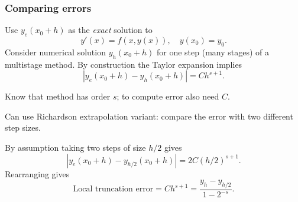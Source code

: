 \documentclass{beamer}
\begin{document}
\begin{frame}
  \frametitle{Comparing errors}

  Use $y_e(x_0 + h)$ as the \emph{exact} solution to
  \begin{equation*}
    y'(x) = f(x, y(x)), \quad y(x_0) = y_0.
  \end{equation*}
  Consider numerical solution $y_h(x_0 + h)$ for one step (many
  stages) of a multistage method. \pause By construction the Taylor
  expansion implies
  \begin{equation*}
    | y_e(x_0 + h) - y_h(x_0 + h) | = C h^{s+1}.
  \end{equation*} \pause

  \begin{overlayarea}{\textwidth}{0.4\textheight}
    {
      Know that method has order $s$; to compute error also
      need $C$.
    }
    {

      \vspace{1ex}
      Can use Richardson extrapolation variant: compare the error with
      two different step sizes.
    }
    {
      By assumption taking two steps of size $h/2$ gives
      \begin{equation*}
        | y_e(x_0 + h) - y_{h/2}(x_0 + h) | = 2 C (h/2)^{s+1}.
      \end{equation*}
    }
    {
      Rearranging gives
      \begin{equation*}
        \text{Local truncation error} = C h^{s+1} = \frac{y_h -
          y_{h/2}}{1 - 2^{-s}}.
      \end{equation*}
    }
  \end{overlayarea}
\end{frame}
\end{document}
